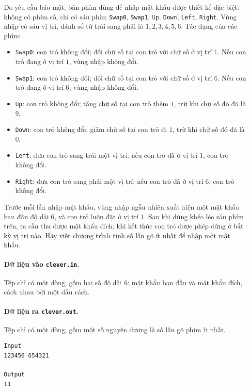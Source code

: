 \documentclass[11pt]{article}
\begin{document}
Do yêu cầu bảo mật, bàn phím dùng để nhập mật khẩu được thiết kế đặc biệt:
không có phím số, chỉ có sáu phím \texttt{Swap0}, \texttt{Swap1},
\texttt{Up}, \texttt{Down}, \texttt{Left}, \texttt{Right}. Vùng nhập có sáu
vị trí, đánh số từ trái sang phải là \(1,2,3,4,5,6\). Tác dụng của các phím:
\begin{itemize}
  \item \texttt{Swap0}: con trỏ không đổi; đổi chữ số tại con trỏ với chữ số ở
  vị trí \(1\). Nếu con trỏ đang ở vị trí \(1\), vùng nhập không đổi.
  \item \texttt{Swap1}: con trỏ không đổi; đổi chữ số tại con trỏ với chữ số ở
  vị trí \(6\). Nếu con trỏ đang ở vị trí \(6\), vùng nhập không đổi.
  \item \texttt{Up}: con trỏ không đổi; tăng chữ số tại con trỏ thêm \(1\),
  trừ khi chữ số đó đã là \(9\).
  \item \texttt{Down}: con trỏ không đổi; giảm chữ số tại con trỏ đi \(1\),
  trừ khi chữ số đó đã là \(0\).
  \item \texttt{Left}: đưa con trỏ sang trái một vị trí; nếu con trỏ đã ở vị
  trí \(1\), con trỏ không đổi.
  \item \texttt{Right}: đưa con trỏ sang phải một vị trí; nếu con trỏ đã ở vị
  trí \(6\), con trỏ không đổi.
\end{itemize}

Trước mỗi lần nhập mật khẩu, vùng nhập ngẫu nhiên xuất hiện một mật khẩu ban
đầu độ dài \(6\), và con trỏ luôn đặt ở vị trí \(1\). Sau khi dùng khéo léo
sáu phím trên, ta cần thu được mật khẩu đích; khi kết thúc con trỏ được phép
dừng ở bất kỳ vị trí nào. Hãy viết chương trình tính số lần gõ ít nhất để
nhập một mật khẩu.

\paragraph{Dữ liệu vào \texttt{clever.in}.}
Tệp chỉ có một dòng, gồm hai số độ dài \(6\): mật khẩu ban đầu và mật khẩu
đích, cách nhau bởi một dấu cách.

\paragraph{Dữ liệu ra \texttt{clever.out}.}
Tệp chỉ có một dòng, gồm một số nguyên dương là số lần gõ phím ít nhất.

\begin{verbatim}
Input
123456 654321

Output
11
\end{verbatim}
\end{document}
